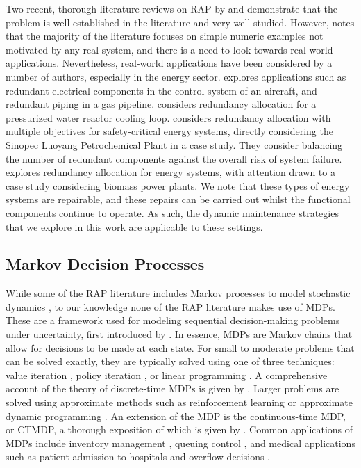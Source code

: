 \documentclass[11pt,authoryear,a4paper]{article}
\theoremstyle{definition}
\begin{document}
{Two recent, thorough literature reviews on RAP by \cite{devi2023RAPlitReview} and \cite{guanCoit2025RAPlitReview} demonstrate that the problem is well established in the literature and very well studied. However, \cite{devi2023RAPlitReview} notes that the majority of the literature focuses on {\color{black}simple numeric examples not motivated by any real system}, and there is a need to look towards real-world applications. Nevertheless, real-world applications have been considered by a number of authors, especially in the energy sector. \cite{kuo2001optimalReliabilityDesign} explores applications such as redundant electrical components in the control system of an aircraft, and redundant piping in a gas pipeline. \cite{ANAND1994pwrCooling} considers redundancy allocation for a pressurized water reactor cooling loop. \cite{SULE2019SafetyCriticalEnergy} considers redundancy allocation with multiple objectives for safety-critical energy systems, directly considering the Sinopec Luoyang Petrochemical Plant in a case study. They consider balancing the number of redundant components against the overall risk of system failure. \cite{ling2021energySystems} explores redundancy allocation for energy systems, with attention drawn to a case study considering biomass power plants. We note that these types of energy systems are repairable, and these repairs can be carried out whilst the functional components continue to operate. As such, the dynamic maintenance strategies that we explore in this work are applicable to these settings.
}
\subsection{Markov Decision Processes}
While some of the RAP literature includes Markov processes to model stochastic dynamics \citep{KAYEDPOUR2017repairableMarkovFiniteHorizon, tavana2018multistate}, to our knowledge none of the RAP literature makes use of MDPs. These are a framework used for modeling sequential decision-making problems under uncertainty, first introduced by \cite{bellman1957markovian}. In essence, MDPs are Markov chains that allow for decisions to be made at each state. For small to moderate problems that can be solved exactly, they are typically solved using one of three techniques: value iteration \citep{bellman1957markovian}, policy iteration \citep{howard1960dynamic}, or linear programming \citep{epenoux1963mdpLP}. A comprehensive account of the theory of discrete-time MDPs is given by \cite{Puterman1994MarkovDP}. Larger problems are solved using approximate methods such as reinforcement learning \citep{sutton2018reinforcement} or approximate dynamic programming \citep{powell2011adp}. An extension of the MDP is the continuous-time MDP, or CTMDP, a thorough exposition of which is given by \cite{xianping2009continuous}. Common applications of MDPs include inventory management \citep{bertsekas2012dynamic}, queuing control \citep{adusumilli2010queue}, and medical applications such as patient admission to hospitals \citep{nunes2009markovpatient} and overflow decisions \citep{dai2019inpatient}. 
\end{document}
